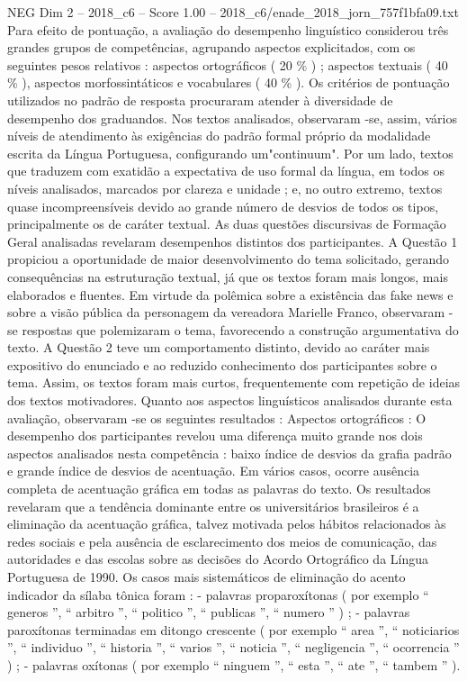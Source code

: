 \begin{textsample}{NEG Dim 2 – 2018\_c6 – Score 1.00 – 2018\_c6/enade\_2018\_jorn\_757f1bfa09.txt}
Para efeito de pontuação, a avaliação do desempenho linguístico considerou três grandes grupos de competências, agrupando aspectos explicitados, com os seguintes pesos relativos : aspectos ortográficos ( 20 \% ) ; aspectos textuais ( 40 \% ), aspectos morfossintáticos e vocabulares ( 40 \% ).
Os critérios de pontuação utilizados no padrão de resposta procuraram atender à diversidade de desempenho dos graduandos.
Nos textos analisados, observaram -se, assim, vários níveis de atendimento às exigências do padrão formal próprio da modalidade escrita da Língua Portuguesa, configurando um"continuum".
Por um lado, textos que traduzem com exatidão a expectativa de uso formal da língua, em todos os níveis analisados, marcados por clareza e unidade ; e, no outro extremo, textos quase incompreensíveis devido ao grande número de desvios de todos os tipos, principalmente os de caráter textual.
As duas questões discursivas de Formação Geral analisadas revelaram desempenhos distintos dos participantes.
A Questão 1 propiciou a oportunidade de maior desenvolvimento do tema solicitado, gerando consequências na estruturação textual, já que os textos foram mais longos, mais elaborados e fluentes.
Em virtude da polêmica sobre a existência das fake news e sobre a visão pública da personagem da vereadora Marielle Franco, observaram -se respostas que polemizaram o tema, favorecendo a construção argumentativa do texto.
A Questão 2 teve um comportamento distinto, devido ao caráter mais expositivo do enunciado e ao reduzido conhecimento dos participantes sobre o tema.
Assim, os textos foram mais curtos, frequentemente com repetição de ideias dos textos motivadores.
Quanto aos aspectos linguísticos analisados durante esta avaliação, observaram -se os seguintes resultados : Aspectos ortográficos : O desempenho dos participantes revelou uma diferença muito grande nos dois aspectos analisados nesta competência : baixo índice de desvios da grafia padrão e grande índice de desvios de acentuação.
Em vários casos, ocorre ausência completa de acentuação gráfica em todas as palavras do texto.
Os resultados revelaram que a tendência dominante entre os universitários brasileiros é a eliminação da acentuação gráfica, talvez motivada pelos hábitos relacionados às redes sociais e pela ausência de esclarecimento dos meios de comunicação, das autoridades e das escolas sobre as decisões do Acordo Ortográfico da Língua Portuguesa de 1990.
Os casos mais sistemáticos de eliminação do acento indicador da sílaba tônica foram : - palavras proparoxítonas ( por exemplo “ generos ”, “ arbitro ”, “ politico ”, “ publicas ”, “ numero ” ) ; - palavras paroxítonas terminadas em ditongo crescente ( por exemplo “ area ”, “ noticiarios ”, “ individuo ”, “ historia ”, “ varios ”, “ noticia ”, “ negligencia ”, “ ocorrencia ” ) ; - palavras oxítonas ( por exemplo “ ninguem ”, “ esta ”, “ ate ”, “ tambem ” ).

\end{textsample}

